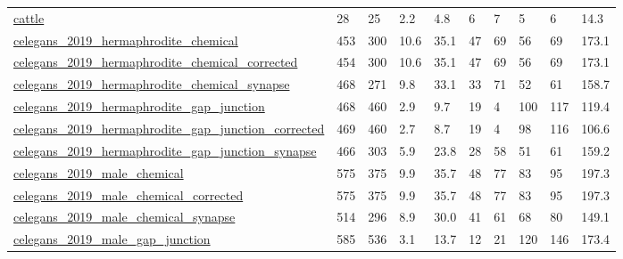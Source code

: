 \begin{longtable}{llllllllll}
 \href{http://konect.cc/networks/moreno_cattle}{cattle}                                                                     & 28         & 25    & 2.2    & 4.8    & 6     & 7      & 5      & 6      & 14.3    \\
 \href{https://wormwiring.org/pages/adjacency.html}{celegans\_2019\_hermaphrodite\_chemical}                                   & 453        & 300   & 10.6   & 35.1   & 47    & 69     & 56     & 69     & 173.1   \\
 \href{https://wormwiring.org/pages/adjacency.html}{celegans\_2019\_hermaphrodite\_chemical\_corrected}                         & 454        & 300   & 10.6   & 35.1   & 47    & 69     & 56     & 69     & 173.1   \\
 \href{https://wormwiring.org/pages/adjacency.html}{celegans\_2019\_hermaphrodite\_chemical\_synapse}                           & 468        & 271   & 9.8    & 33.1   & 33    & 71     & 52     & 61     & 158.7   \\
 \href{https://wormwiring.org/pages/adjacency.html}{celegans\_2019\_hermaphrodite\_gap\_junction}                               & 468        & 460   & 2.9    & 9.7    & 19    & 4      & 100    & 117    & 119.4   \\
 \href{https://wormwiring.org/pages/adjacency.html}{celegans\_2019\_hermaphrodite\_gap\_junction\_corrected}                     & 469        & 460   & 2.7    & 8.7    & 19    & 4      & 98     & 116    & 106.6   \\
 \href{https://wormwiring.org/pages/adjacency.html}{celegans\_2019\_hermaphrodite\_gap\_junction\_synapse}                       & 466        & 303   & 5.9    & 23.8   & 28    & 58     & 51     & 61     & 159.2   \\
 \href{https://wormwiring.org/pages/adjacency.html}{celegans\_2019\_male\_chemical}                                            & 575        & 375   & 9.9    & 35.7   & 48    & 77     & 83     & 95     & 197.3   \\
 \href{https://wormwiring.org/pages/adjacency.html}{celegans\_2019\_male\_chemical\_corrected}                                  & 575        & 375   & 9.9    & 35.7   & 48    & 77     & 83     & 95     & 197.3   \\
 \href{https://wormwiring.org/pages/adjacency.html}{celegans\_2019\_male\_chemical\_synapse}                                    & 514        & 296   & 8.9    & 30.0   & 41    & 61     & 68     & 80     & 149.1   \\
 \href{https://wormwiring.org/pages/adjacency.html}{celegans\_2019\_male\_gap\_junction}                                        & 585        & 536   & 3.1    & 13.7   & 12    & 21     & 120    & 146    & 173.4   \\

\end{longtable}
